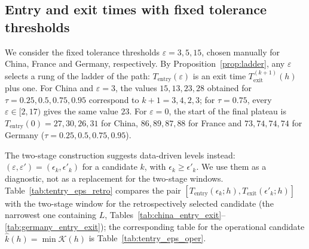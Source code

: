 \documentclass[12pt,a4paper]{article}
\begin{document}
\subsection{Entry and exit times with fixed tolerance thresholds}
\label{subsec:real-entry-eps}

We consider the fixed tolerance thresholds \(\varepsilon=3,5,15\), chosen manually for China, France and Germany, respectively. By Proposition~\ref{prop:ladder}, any \(\varepsilon\) selects a rung of the ladder of the path: \(T_{\mathrm{entry}}(\varepsilon)\) is an exit time \(T_{\mathrm{exit}}^{(k+1)}(h)\) plus one. For China and $\varepsilon=3$, the
values $15,13,23,28$ obtained for $\tau=0.25,0.5,0.75,0.95$ correspond to
$k+1=3,4,2,3$; for $\tau=0.75$, every $\varepsilon\in[2,17)$ gives the same
value $23$. For $\varepsilon=0$, the start of the final plateau is
$T_{\mathrm{entry}}(0)=27,30,26,31$ for China, $86,89,87,88$ for France and
$73,74,74,74$ for Germany ($\tau=0.25,0.5,0.75,0.95$).

The two-stage construction suggests data-driven levels instead:
$(\varepsilon,\varepsilon')=(\epsilon_k,\epsilon'_k)$ for a candidate $k$,
with $\epsilon_k\ge\epsilon'_k$. We use them as a diagnostic, not as a
replacement for the two-stage windows.
Table~\ref{tab:tentry_eps_retro} compares the pair
$[T_{\mathrm{entry}}(\epsilon_k;h),T_{\mathrm{exit}}(\epsilon'_k;h)]$ with
the two-stage window for the retrospectively selected candidate (the
narrowest one containing $L$,
Tables~\ref{tab:china_entry_exit}--\ref{tab:germany_entry_exit}); the
corresponding table for the operational candidate $\hat k(h)=\min\mathcal K(h)$
is Table~\ref{tab:tentry_eps_oper}.
\end{document}
